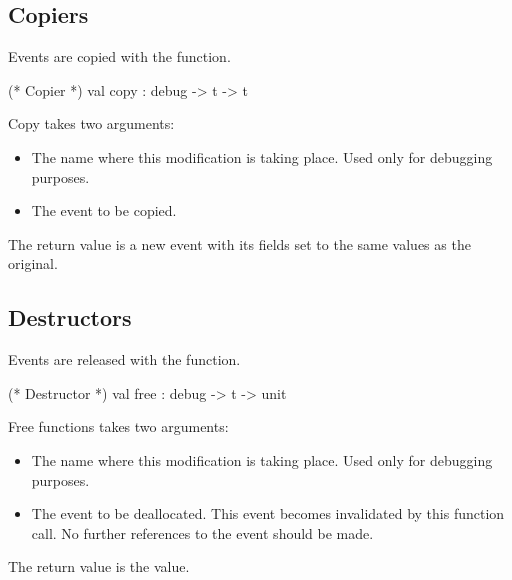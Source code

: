 \subsection{Copiers}
Events are copied with the  function.

\begin{codebox}
  (* Copier *)
val copy	: debug -> t -> t
\end{codebox}

Copy takes two arguments:
\begin{itemize}
\item
The name where this modification is taking place.  Used only for debugging
purposes.
\item
The event to be copied.
\end{itemize}
The return value is a new event with its fields set to the same values as
the original.

\subsection{Destructors}
Events are released with the  function.
\begin{codebox}
  (* Destructor *)
val free	: debug -> t -> unit
\end{codebox}

Free functions takes two arguments:
\begin{itemize}
\item
The name where this modification is taking place.  Used only for debugging
purposes.
\item
The event to be deallocated.  This event becomes invalidated by this
function call.  No further references to the event should be made.
\end{itemize}
The return value is the  value.
